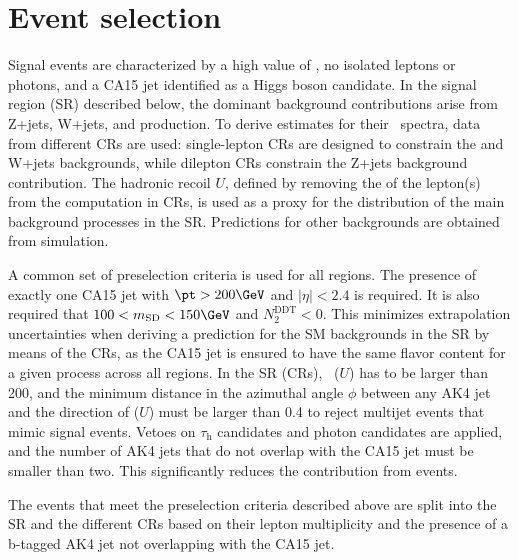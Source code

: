 \section{Event selection}


Signal events are characterized by a high value of \MET, no isolated leptons or photons, and a CA15 jet identified as a Higgs boson candidate. In the signal region (SR) described
below, the dominant background contributions arise from Z+jets, W+jets, and \ttbar production. To derive estimates for their \ptmiss~spectra, data from different CRs are used: single-lepton CRs are designed to constrain the \ttbar and W+jets backgrounds, while dilepton CRs constrain the Z+jets background contribution. The hadronic recoil $U$, defined by removing the \pt of the lepton(s) from the \MET computation in CRs, is used as a proxy for the \MET distribution of the main background processes in the SR. Predictions for other backgrounds are obtained from simulation.

A common set of preselection criteria is used for all regions. The presence of exactly one CA15 jet with $\pt>200\GeV$ and $|\eta|<2.4$ is required. It is also required that $100<m_{\text{SD}}<150\GeV$ and $N_2^{\text{DDT}}<0$. This minimizes extrapolation uncertainties when deriving a prediction for the SM backgrounds in the SR by means of the CRs, as the CA15 jet is ensured to have the same flavor content for a given process across all regions.
 In the SR (CRs), \ptmiss~($U$) has to be larger than 200\GeV, and the minimum distance in the azimuthal angle $\phi$ between any AK4 jet and the direction of \ptmiss ($U$) must be larger than 0.4 to reject multijet events that mimic signal events. Vetoes on $\tau_\text{h}$ candidates and photon candidates are applied, and the number of AK4 jets that do not overlap with the CA15 jet must be smaller than two. This significantly reduces the contribution from \ttbar events.



The events that meet the preselection criteria described above are split into the SR and the different CRs based on their lepton multiplicity and the presence of a b-tagged AK4 jet not overlapping with the CA15 jet.


